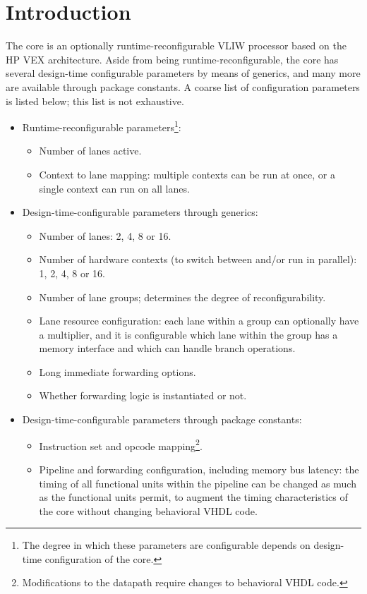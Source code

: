 \documentclass[main.tex]{subfiles}
\begin{document}
\section{Introduction}

The \rvex{} core is an optionally runtime-reconfigurable VLIW processor based on the HP VEX architecture. Aside from being runtime-reconfigurable, the core has several design-time configurable parameters by means of generics, and many more are available through package constants. A coarse list of configuration parameters is listed below; this list is not exhaustive.

\begin{itemize}
  
  \item Runtime-reconfigurable parameters\footnote{The degree in which these parameters are configurable depends on design-time configuration of the core.}:
  \begin{itemize}
    \item Number of lanes active.
    \item Context to lane mapping: multiple contexts can be run at once, or a single context can run on all lanes.
  \end{itemize}
  
  \item Design-time-configurable parameters through generics:
  \begin{itemize}
    \item Number of lanes: 2, 4, 8 or 16.
    \item Number of hardware contexts (to switch between and/or run in parallel): 1, 2, 4, 8 or 16.
    \item Number of lane groups; determines the degree of reconfigurability.
    \item Lane resource configuration: each lane within a group can optionally have a multiplier, and it is configurable which lane within the group has a memory interface and which can handle branch operations.
    \item Long immediate forwarding options.
    \item Whether forwarding logic is instantiated or not.
  \end{itemize}
  
  \item Design-time-configurable parameters through package constants:
  \begin{itemize}
    \item Instruction set and opcode mapping\footnote{Modifications to the datapath require changes to behavioral VHDL code.}.
    \item Pipeline and forwarding configuration, including memory bus latency: the timing of all functional units within the pipeline can be changed as much as the functional units permit, to augment the timing characteristics of the core without changing behavioral VHDL code.
  \end{itemize}

\end{itemize}
\end{document}
